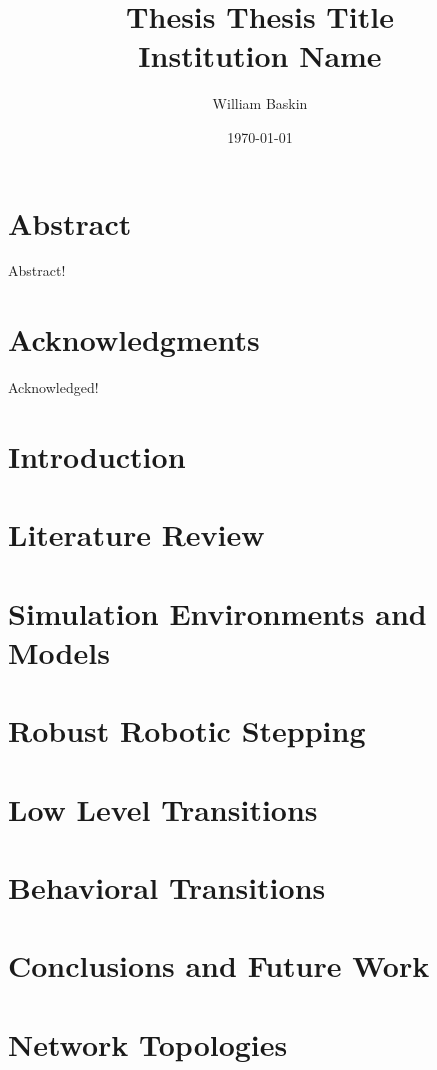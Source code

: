 \documentclass[12pt, letterpaper, oneside, onecolumn]{report}
\author{William Baskin}
\title{Thesis}
\title{
	{Thesis Title}\\
	{\large Institution Name}%
}
\date{\today}
\begin{document}
\maketitle


\tableofcontents

\listoffigures

\chapter*{Abstract}
Abstract!

\chapter*{Acknowledgments}
Acknowledged!

\chapter{Introduction}


\chapter{Literature Review}


\chapter{Simulation Environments and Models}


\chapter{Robust Robotic Stepping}


\chapter{Low Level Transitions}


\chapter{Behavioral Transitions}


\chapter{Conclusions and Future Work}


\appendix
\chapter{Network Topologies}


\printbibliography
\end{document}
